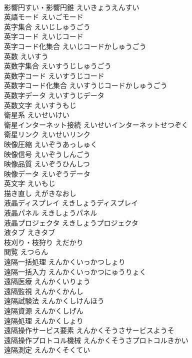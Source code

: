 \documentclass[8pt]{extreport}
\begin{document}
\begin{CJK}{UTF8}{min}
\\	影響円すい・影響円錐	えいきょうえんすい	
\\	英語モード	えいごモード	
\\	英字集合	えいじしゅうごう	
\\	英字コード	えいじコード	
\\	英字コード化集合	えいじコードかしゅうごう	
\\	英数	えいすう	
\\	英数字集合	えいすうじしゅうごう	
\\	英数字コード	えいすうじコード	
\\	英数字コード化集合	えいすうじコードかしゅうごう	
\\	英数字データ	えいすうじデータ	
\\	英数文字	えいすうもじ	
\\	衛星系	えいせいけい	
\\	衛星インターネット接続	えいせいインターネットせつぞく	
\\	衛星リンク	えいせいリンク	
\\	映像圧縮	えいぞうあっしゅく	
\\	映像信号	えいぞうしんごう	
\\	映像品質	えいぞうひんしつ	
\\	映像データ	えいぞうデータ	
\\	英文字	えいもじ	
\\	描き直し	えがきなおし	
\\	液晶ディスプレイ	えきしょうディスプレイ	
\\	液晶パネル	えきしょうパネル	
\\	液晶プロジェクタ	えきしょうプロジェクタ	
\\	液タブ	えきタブ	
\\	枝刈り・枝狩り	えだかり	
\\	閲覧	えつらん	
\\	遠隔一括処理	えんかくいっかつしょり	
\\	遠隔一括入力	えんかくいっかつにゅうりょく	
\\	遠隔医療	えんかくいりょう	
\\	遠隔監視	えんかくかんし	
\\	遠隔試験法	えんかくしけんほう	
\\	遠隔資源	えんかくしげん	
\\	遠隔処理	えんかくしょり	
\\	遠隔操作サービス要素	えんかくそうさサービスようそ	
\\	遠隔操作プロトコル機械	えんかくそうさプロトコルきかい	
\\	遠隔測定	えんかくそくてい	

\end{CJK}
\end{document}
